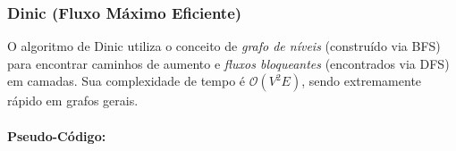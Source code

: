 \subsubsection{Dinic (Fluxo Máximo Eficiente)}
O algoritmo de Dinic utiliza o conceito de \textit{grafo de níveis} (construído
via BFS) para encontrar caminhos de aumento e \textit{fluxos bloqueantes}
(encontrados via DFS) em camadas. Sua complexidade de tempo é $\mathcal{O}(V^2
    E)$, sendo extremamente rápido em grafos gerais.

\paragraph{Pseudo-Código: }\mbox{}\\
\begin{algorithm}[H]
    \SetAlgoLined

    \caption{Algoritmo de Dinic}
\end{algorithm}

